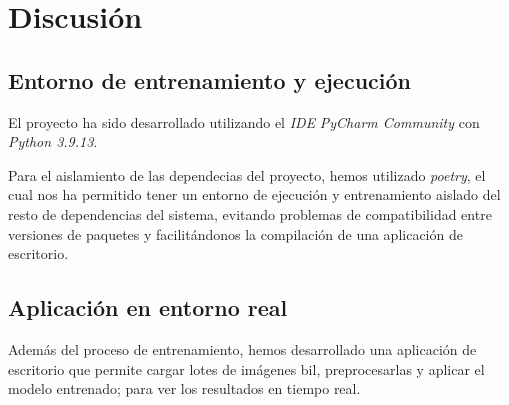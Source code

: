 \section{Discusión}

\subsection{Entorno de entrenamiento y ejecución}

El proyecto ha sido desarrollado utilizando el \textit{IDE} \textit{PyCharm Community} con \textit{Python 3.9.13}.

Para el aislamiento de las dependecias del proyecto, hemos utilizado \textit{poetry}, el cual nos ha permitido tener un entorno de ejecución y entrenamiento aislado del resto de dependencias del sistema, evitando problemas de compatibilidad entre versiones de paquetes y facilitándonos la compilación de una aplicación de escritorio.

\subsection{Aplicación en entorno real}

Además del proceso de entrenamiento, hemos desarrollado una aplicación de escritorio que permite cargar lotes de imágenes \gls{bil}, preprocesarlas y aplicar el modelo entrenado; para ver los resultados en tiempo real.
